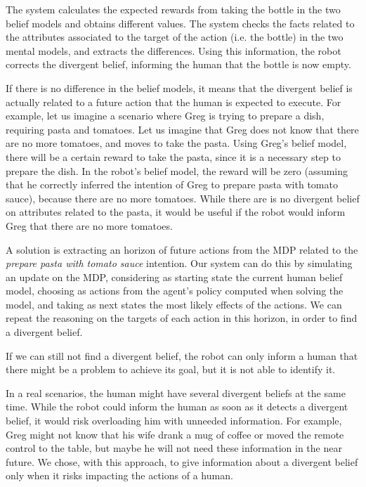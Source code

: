 The system calculates the expected rewards from taking the bottle in the two belief models and obtains different values. The system checks the facts related to the attributes associated to the target of the action (i.e. the bottle) in the two mental models, and extracts the differences.  Using this information, the robot corrects the divergent belief, informing the human that the bottle is now empty. 

If there is no difference in the belief models, it means that the divergent belief is actually related to a future action that the human is expected to execute. For example, let us imagine a scenario where Greg is trying to prepare a dish, requiring pasta and tomatoes. Let us imagine that Greg does not know that there are no more tomatoes, and moves to take the pasta. Using Greg's belief model, there will be a certain reward to take the pasta, since it is a necessary step to prepare the dish. In the robot's belief model, the reward will be zero (assuming that he correctly inferred the intention of Greg to prepare pasta with tomato sauce), because there are no more tomatoes. While there are is no divergent belief on attributes related to the pasta, it would be useful if the robot would inform Greg that there are no more tomatoes.

A solution is extracting an horizon of future actions from the MDP related to the \textit{prepare pasta with tomato sauce} intention. Our system can do this by simulating an update on the MDP, considering as starting state the current human belief model, choosing as actions from the agent's policy computed when solving the model, and taking as next states the most likely effects of the actions. We can repeat the reasoning on the targets of each action in this horizon, in order to find a divergent belief. 

If we can still not find a divergent belief, the robot can only inform a human that there might be a problem to achieve its goal, but it is not able to identify it.


In a real scenarios, the human might have several divergent beliefs at the same time. While the robot could inform the human as soon as it detects a divergent belief, it would risk overloading him with unneeded information. For example, Greg might not know that his wife drank a mug of coffee or moved the remote control to the table, but maybe he will not need these information in the near future. We chose, with this approach, to give information about a divergent belief only when it risks impacting the actions of a human.


